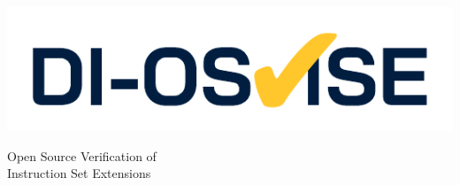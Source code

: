 \documentclass[portrait,a0]{a0poster}
\begin{document}
\noindent\begin{minipage}[t]{0.3\textwidth}
    \includegraphics[scale=3]{di-osvise}
\end{minipage}
\begin{minipage}[c]{0.7\textwidth}
\begin{flushright}
    \begin{spacing}{1}
        \VERYHuge \extrabold \color{ciblue}Open Source Verification of \\ Instruction Set Extensions%
    \end{spacing}
\end{flushright}
\end{minipage}
\end{document}
